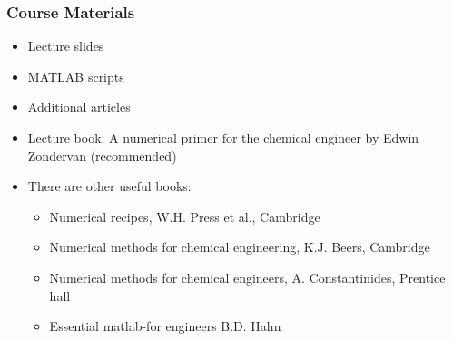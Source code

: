 \documentclass[11pt,table,final,fleqn,xcolor={usenames,dvipsnames}]{beamer}
\begin{document}
\begin{frame}
 \frametitle{Course Materials}
 \begin{itemize}
  \item Lecture slides
  \item MATLAB scripts
  \item Additional articles
  \item Lecture book: A numerical primer for the chemical engineer by Edwin Zondervan (recommended) \pause
  \item There are other useful books:
  \begin{itemize}
    \item Numerical recipes, W.H. Press et al., Cambridge
    \item Numerical methods for chemical engineering, K.J. Beers, Cambridge
    \item Numerical methods for chemical engineers, A. Constantinides, Prentice hall
    \item Essential matlab-for engineers B.D. Hahn
  \end{itemize}
 \end{itemize}
\end{frame}
\end{document}
